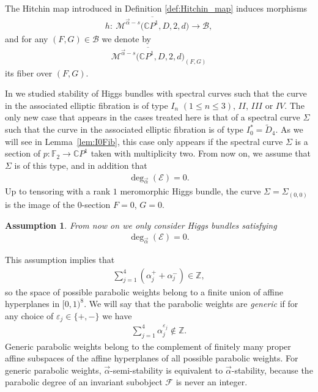 \documentclass[10pt,a4paper]{amsart}
\newcommand{\Z}{{\mathbb Z}} %
\newcommand{\CP}[1]{\mathbb{C}P^{#1}} %
\newcommand{\E}{{\mathcal E}} %
\newcommand{\F}{{\mathcal F}} %
\newcommand{\Mod}{{\mathcal M}} %
\newcommand{\pardeg}{\deg_{\vec{\alpha}}}
\numberwithin{equation}{section}
\newtheorem{assn}[prop]{Assumption}
{ \theoremstyle{definition}
\newtheorem{defn}[prop]{Definition}
\newtheorem{Example}[prop]{Example}
\newtheorem{Remark}[prop]{Remark}}
\begin{document}
The Hitchin map introduced in Definition \ref{def:Hitchin_map} induces morphisms
\begin{gather*}
 h\colon \ {\overline{\Mod^{\vec{\alpha}-s} \big(\CP1, D, 2,d \big)}} \to \mathcal{B},
\end{gather*}
and for any $(F,G) \in \mathcal{B}$ we denote by
\begin{gather*}
 {\overline{\Mod^{\vec{\alpha}-s} \big(\CP1, D, 2,d \big)}}_{(F,G)}
\end{gather*}
its fiber over $(F,G)$.

In \cite{ISS, ISS2} we studied stability of Higgs bundles with spectral curves such that the curve in the associated elliptic fibration is of type $I_n$ $(1 \leq n \leq 3)$, $II$, $III$ or $IV$. The only new case that appears in the cases treated here is that of a spectral curve $\Sigma$ such that the curve in the associated elliptic fibration is of type $I_0^* = \tilde{D}_4$. As we will see in Lemma~\ref{lem:I0Fib}, this case only appears if the spectral curve $\Sigma$ is a section of $p\colon {\mathbb {F}}_2 \to \CP1$ taken with multiplicity two. From now on, we assume that $\Sigma$ is of this type, and in addition that
\begin{gather*}%
 \pardeg (\E ) = 0.
\end{gather*}
Up to tensoring with a rank $1$ meromorphic Higgs bundle, the curve $\Sigma = \Sigma_{(0,0)}$ is the image of the $0$-section $F = 0$, $G = 0$.

 \begin{assn} From now on we only consider Higgs bundles satisfying
 \begin{gather*}
 \pardeg (\E ) = 0.
 \end{gather*}
 \end{assn}

This assumption implies that
\begin{gather*}
 \sum_{j=1}^4 (\alpha_j^+ + \alpha_j^-) \in \Z,
\end{gather*}
so the space of possible parabolic weights belong to a finite union of affine hyperplanes in $[0,1)^8$.
We will say that the parabolic weights are {\it generic} if for any choice of $\varepsilon_j \in \{ +, - \}$ we have
\begin{gather*}
 \sum_{j=1}^4 \alpha_j^{\varepsilon_j} \notin \Z.
\end{gather*}
Generic parabolic weights belong to the complement of finitely many proper affine subspaces of the affine hyperplanes of all possible parabolic weights.
For generic parabolic weights, $\vec{\alpha}$-semi-stability is equivalent to $\vec{\alpha}$-stability, because the parabolic degree of an invariant subobject
$\F$ is never an integer.
\end{document}
